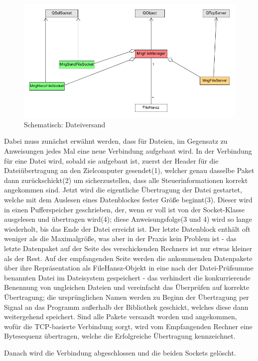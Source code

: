 \begin{figure}
\includegraphics[scale=.35]{classDiagFile}
\caption{Schematisch: Dateiversand}
\label{file_d}
\end{figure}

Dabei muss zunächst erwähnt werden, dass für Dateien, im Gegensatz zu Anweisungen jedes Mal eine neue Verbindung aufgebaut wird.
In der Verbindung für eine Datei wird, sobald sie aufgebaut ist, zuerst der Header für die Dateiübertragung an den Zielcomputer gesendet(1), welcher genau dasselbe Paket dann zurückschickt(2) um sicherzustellen, dass alle Steuerinformationen korrekt angekommen sind.
Jetzt wird die eigentliche Übertragung der Datei gestartet, welche mit dem Auslesen eines Datenblockes fester Größe beginnt(3).
Dieser wird in einen Pufferspeicher geschrieben, der, wenn er voll ist von der Socket-Klasse ausgelesen und übertragen wird(4); diese Anweisungsfolge(3 und 4) wird so lange wiederholt, bis das Ende der Datei erreicht ist.
Der letzte Datenblock enthält oft weniger als die Maximalgröße, was aber in der Praxis kein Problem ist - das letzte Datenpaket auf der Seite des verschickenden Rechners ist nur etwas kleiner als der Rest.
Auf der empfangenden Seite werden die ankommenden Datenpakete über ihre Repräsentation als FileHansz-Objekt in eine nach der Datei-Prüfsumme benannten Datei im Dateisystem gespeichert - das verhindert die konkurrierende Benennung von ungleichen Dateien und vereinfacht das Überprüfen auf korrekte Übertragung; die ursprünglichen Namen werden zu Beginn der Übertragung per Signal an das Programm außerhalb der Bibliothek geschickt, welches diese dann weitergehend speichert.
Sind alle Pakete versandt worden und angekommen, wofür die TCP-basierte Verbindung sorgt, wird vom Empfangenden Rechner eine Bytesequenz übertragen, welche die Erfolgreiche Übertragung kennzeichnet.\par
Danach wird die Verbindung abgeschlossen und die beiden Sockets gelöscht.\\
%